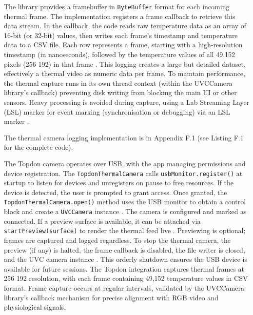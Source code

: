 The library provides a framebuffer in \texttt{ByteBuffer} format for each incoming thermal frame. The implementation registers a frame callback to retrieve this data stream. In the callback, the code reads raw temperature data as an array of 16-bit (or 32-bit) values, then writes each frame's timestamp and temperature data to a CSV file. Each row represents a frame, starting with a high-resolution timestamp (in nanoseconds), followed by the temperature values of all 49{,}152 pixels (256\,\texttimes\,192) in that frame \cite{ref16}. This logging creates a large but detailed dataset, effectively a thermal video as numeric data per frame. To maintain performance, the thermal capture runs in its own thread context (within the UVCCamera library's callback) preventing disk writing from blocking the main UI or other sensors. Heavy processing is avoided during capture, using a Lab Streaming Layer (LSL) marker for event marking (synchronisation or debugging) via an LSL marker \cite{ref9}.

The thermal camera logging implementation is in Appendix F.1 (see Listing F.1 for the complete code).

The Topdon camera operates over USB, with the app managing permissions and device registration. The \texttt{TopdonThermalCamera} calls \texttt{usbMonitor.register()} at startup to listen for devices \cite{ref16} and unregisters on pause to free resources. If the device is detected, the user is prompted to grant access. Once granted, the \texttt{TopdonThermalCamera.open()} method uses the USB monitor to obtain a control block and create a \texttt{UVCCamera} instance \cite{ref16}. The camera is configured and marked as connected. If a preview surface is available, it can be attached via \texttt{startPreview(surface)} to render the thermal feed live \cite{ref16}. Previewing is optional; frames are captured and logged regardless. To stop the thermal camera, the preview (if any) is halted, the frame callback is disabled, the file writer is closed, and the UVC camera instance \cite{ref16}. This orderly shutdown ensures the USB device is available for future sessions. The Topdon integration captures thermal frames at 256\,\texttimes\,192 resolution, with each frame containing 49{,}152 temperature values in CSV format. Frame capture occurs at regular intervals, validated by the UVCCamera library's callback mechanism for precise alignment with RGB video and physiological signals.

